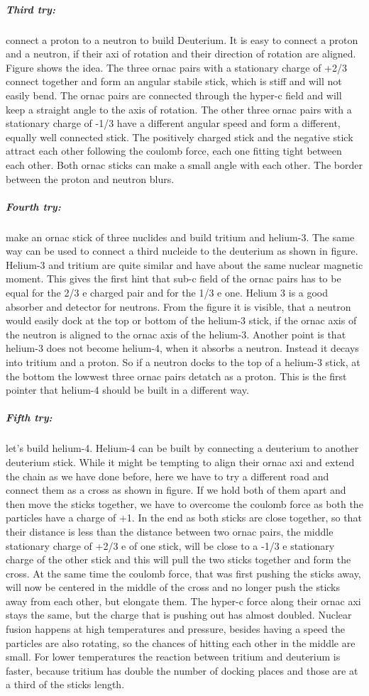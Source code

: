 \subparagraph{
Third try:} connect a proton to a neutron to build Deuterium. It is easy to connect a proton and a neutron, if their axi of rotation and their direction of rotation are aligned. Figure shows the idea. The three ornac pairs with a stationary charge of +2/3 connect together and form an angular stabile stick, which is stiff and will not easily bend.  The ornac pairs are connected through the hyper-c field and will keep a straight angle to the axis of rotation. The other three ornac pairs with a stationary charge of -1/3 have a different angular speed and form a different, equally well connected stick. The positively charged stick and the negative stick attract each other following the coulomb force, each one fitting tight between each other. Both ornac sticks can make a small angle with each other. The border between the proton and neutron blurs.

\subparagraph{
Fourth try:} make an ornac stick of three nuclides and build tritium and helium-3. The same way can be used to connect a third nucleide to the deuterium as shown in figure. Helium-3 and tritium are quite similar and have about the same nuclear magnetic moment. This gives the first hint that sub-c field of the ornac pairs has to be equal for the 2/3 e charged pair and for the 1/3 e one. Helium 3 is a good absorber and detector for neutrons. From the figure it is visible, that a neutron would easily dock at the top or bottom of the helium-3 stick, if the ornac axis of the neutron is aligned to the ornac axis of the helium-3. Another point is that helium-3 does not become helium-4, when it absorbs a neutron. Instead it decays into tritium and a proton. So if a neutron docks to the top of a helium-3 stick, at the bottom the lowwest three ornac pairs detatch as a proton. This is the first pointer that helium-4 should be built in a different way.

\subparagraph{
Fifth try:} let's build helium-4. Helium-4 can be built by connecting a deuterium to another deuterium stick. While it might be tempting to align their ornac axi and extend the chain as we have done before, here we have to try a different road and connect them as a cross as shown in figure. If we hold both of them apart and then move the sticks together, we have to overcome the coulomb force as both the particles have a charge of +1. In the end as both sticks are close together, so that their distance is less than the distance between two ornac pairs,  the middle stationary charge of +2/3 e of one stick, will be close to a -1/3 e stationary charge of the other stick and this will pull the two sticks together and form the cross. At the same time the coulomb force, that was first pushing the sticks away, will now be centered in the middle of the cross and no longer push the sticks away from each other, but elongate them. The hyper-c force along their ornac axi stays the same, but the charge that is pushing out has almost doubled. 
Nuclear fusion happens at high temperatures and pressure, besides having a speed the particles are also rotating, so the chances of hitting each other in the middle are small. For lower temperatures the reaction between tritium and deuterium is faster, because tritium has double the number of docking places and those are at a third of the sticks length.


